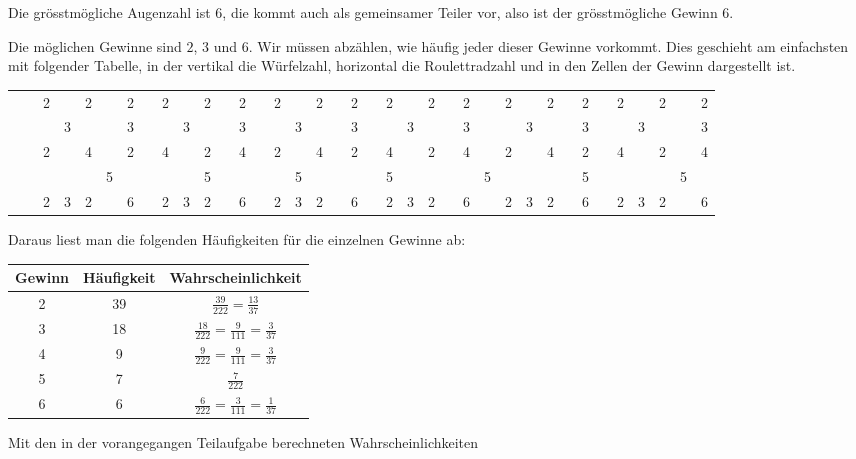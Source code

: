 \begin{loesung}
\begin{teilaufgaben}
\item
Die grösstmögliche Augenzahl ist $6$, die kommt auch als gemeinsamer
Teiler vor, also ist  der grösstmögliche Gewinn $6$.
\item
Die möglichen Gewinne sind $2$, $3$ und $6$. Wir müssen abzählen,
wie häufig jeder dieser Gewinne vorkommt. Dies geschieht am einfachsten
mit folgender Tabelle, in der vertikal die Würfelzahl, horizontal die
Roulettradzahl und in den Zellen der Gewinn dargestellt ist.
\begin{center}
\begin{small}
\renewcommand{\tabcolsep}{3pt}
\begin{tabular}{|c|c|c|c|c|c|c|c|c|c|c|c|c|c|c|c|c|c|c|c|c|c|c|c|c|c|c|c|c|c|c|c|c|c|c|c|c|}
\hline
\phantom{0}&\phantom{0}&&&&&&\phantom{0}&&&&\phantom{0}&&\phantom{0}&&&&\phantom{0}&&\phantom{0}&&&&\phantom{0}&&&&&&\phantom{0}&&\phantom{0}&&&&&\\
\hline
&&2&&2&&2&&2&&2&&2&&2&&2&&2&&2&&2&&2&&2&&2&&2&&2&&2&&2\\
\hline
&&&3&&&3&&&3&&&3&&&3&&&3&&&3&&&3&&&3&&&3&&&3&&&3\\
\hline
&&2&&4&&2&&4&&2&&4&&2&&4&&2&&4&&2&&4&&2&&4&&2&&4&&2&&4\\
\hline
&&&&&5&&&&&5&&&&&5&&&&&5&&&&&5&&&&&5&&&&&5&\\
\hline
&&2&3&2&&6&&2&3&2&&6&&2&3&2&&6&&2&3&2&&6&&2&3&2&&6&&2&3&2&&6\\
\hline
\end{tabular}
\end{small}
\end{center}
Daraus liest man die folgenden Häufigkeiten für die einzelnen
Gewinne ab:
\begin{center}
\renewcommand{\arraystretch}{1.2}
\begin {tabular}{|c|c|c|}
\hline
Gewinn&Häufigkeit&Wahrscheinlichkeit\\
\hline
2&39&$\frac{39}{222}=\frac{13}{37}$\\
3&18&$\frac{18}{222}=\frac9{111}=\frac3{37}$\\
4&9&$\frac{9}{222}=\frac9{111}=\frac3{37}$\\
5&7&$\frac7{222}$\\
6&6&$\frac{6}{222}=\frac3{111}=\frac1{37}$\\
\hline
\end {tabular}
\end{center}
\item Mit den in der vorangegangen Teilaufgabe berechneten Wahrscheinlichkeiten

\end{teilaufgaben}
\end{loesung}
